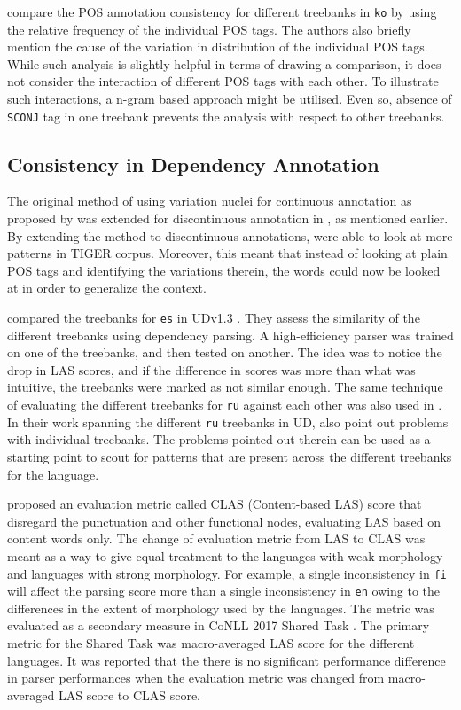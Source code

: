 \cite{korean} compare the POS annotation consistency for different treebanks in \verb|ko| by using the relative frequency of the individual POS tags. The authors also briefly mention the cause of the variation in distribution of the individual POS tags. While such analysis is slightly helpful in terms of drawing a comparison, it does not consider the interaction of different POS tags with each other. To illustrate such interactions, a n-gram based approach might be utilised. Even so, absence of \verb|SCONJ| tag in one treebank prevents the analysis with respect to other treebanks.

\subsection{Consistency in Dependency Annotation}
\label{ssec:inconsistency-detection-deprel}

The original method of using variation nuclei for continuous annotation as proposed by \cite{dickinson03a, dickinson03b} was extended for discontinuous annotation in \cite{dickinson05}, as mentioned earlier. By extending the method to discontinuous annotations, \citeauthor{dickinson05} were able to look at more patterns in TIGER corpus. Moreover, this meant that instead of looking at plain POS tags and identifying the variations therein, the words could now be looked at in order to generalize the context.

\cite{alonso2016universal} compared the treebanks for \verb|es| in UDv1.3 \citep{UDv1.3}. They assess the similarity of the different treebanks using dependency parsing. A high-efficiency parser was trained on one of the treebanks, and then tested on another. The idea was to notice the drop in LAS scores, and if the difference in scores was more than what was intuitive, the treebanks were marked as not similar enough. The same technique of evaluating the different treebanks for \verb|ru| against each other was also used in \cite{RussianTreebanks}. In their work spanning the different \verb|ru| treebanks in UD, \citeauthor{RussianTreebanks} also point out problems with individual treebanks. The problems pointed out therein can be used as a starting point to scout for patterns that are present across the different treebanks for the language. 

\cite{CLAS} proposed an evaluation metric called CLAS (Content-based LAS) score that disregard the punctuation and other functional nodes, evaluating LAS based on content words only. The change of evaluation metric from LAS to CLAS was meant as a way to give equal treatment to the languages with weak morphology and languages with strong morphology. For example, a single inconsistency in \verb|fi| will affect the parsing score more than a single inconsistency in \verb|en| owing to the differences in the extent of morphology used by the languages. The metric was evaluated as a secondary measure in CoNLL 2017 Shared Task \citep{CLAS_test}. The primary metric for the Shared Task was macro-averaged LAS score for the different languages. It was reported that the there is no significant performance difference in parser performances when the evaluation metric was changed from macro-averaged LAS score to CLAS score.

